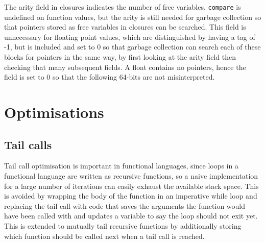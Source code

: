 The arity field in closures indicates the number of free variables. \verb|compare| is undefined on function values, but the arity is still needed for garbage collection so that pointers stored as free variables in closures can be searched. This field is unnecessary for floating point values, which are distinguished by having a tag of -1, but is included and set to 0 so that garbage collection can search each of these blocks for pointers in the same way, by first looking at the arity field then checking that many subsequent fields. A float contains no pointers, hence the field is set to 0 so that the following 64-bits are not misinterpreted.





\section{Optimisations}
\subsection{Tail calls}
Tail call optimisation is important in functional languages, since loops in a functional language are written as recursive functions, so a naive implementation for a large number of iterations can easily exhaust the available stack space. This is avoided by wrapping the body of the function in an imperative while loop and replacing the tail call with code that saves the arguments the function would have been called with and updates a variable to say the loop should not exit yet. This is extended to mutually tail recursive functions by additionally storing which function should be called next when a tail call is reached.

